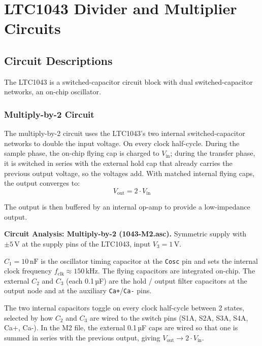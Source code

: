 \section{LTC1043 Divider and Multiplier Circuits}

\subsection{Circuit Descriptions}

The LTC1043 is a  switched-capacitor circuit block with dual switched-capacitor networks, an on-chip oscillator.

\subsubsection{Multiply-by-2 Circuit}

The multiply-by-2 circuit uses the LTC1043's two internal switched-capacitor networks to double the input voltage. On every clock half-cycle. During the sample phase, the on-chip flying cap is charged to $V_{\text{in}}$; during the transfer phase, it is switched in series with the external hold cap that already carries the previous output voltage, so the voltages add. With matched internal flying caps, the output converges to:
\begin{equation}
	V_{\text{out}} = 2 \cdot V_{\text{in}}
\end{equation}

The output is then buffered by an internal op-amp to provide a low-impedance output.

\textbf{Circuit Analysis: Multiply-by-2 (1043-M2.asc).}
	Symmetric supply with $\pm 5\,\text{V}$ at the supply pins of the LTC1043, input $V_3 = 1\,\text{V}$.

	$C_1 = 10\,\text{nF}$ is the oscillator timing capacitor at the \texttt{Cosc} pin and sets the internal clock frequency $f_{\text{clk}} \approx 150\,\text{kHz}$. The flying capacitors are integrated on-chip. The external $C_2$ and $C_3$ (each 0.1\,µF) are the hold / output filter capacitors at the output node and at the auxiliary \texttt{Ca+}/\texttt{Ca-} pins.

	The two internal capacitors toggle on every clock half-cycle between 2 states, selected by how $C_2$ and $C_3$ are wired to the switch pins (S1A, S2A, S3A, S4A, Ca+, Ca-). In the M2 file, the external 0.1\,µF caps are wired so that one is summed in series with the previous output, giving $V_{\text{out}} \to 2 \cdot V_{\text{in}}$.

